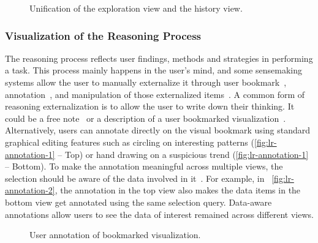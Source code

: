 \begin{figure}[!htb]
\centering
{} 
\hfill
{}
\caption{Unification of the exploration view and the history view. }
\end{figure}

\subsubsection{Visualization of the Reasoning Process}
The reasoning process reflects user findings, methods and strategies in performing a task. This process mainly happens in the user's mind, and some sensemaking systems allow the user to manually externalize it through user bookmark~\cite{Walker2013}, annotation~\cite{Heer2009}, and manipulation of those externalized items~\cite{Xu2014}. A common form of reasoning externalization is to allow the user to write down their thinking. It could be a free note~\cite{Shrinivasan2008} or a description of a user bookmarked visualization~\cite{Walker2013}. Alternatively, users can annotate directly on the visual bookmark using standard graphical editing features such as circling on interesting patterns (\autoref{fig:lr-annotation-1} -- Top) or hand drawing on a suspicious trend (\autoref{fig:lr-annotation-1} -- Bottom). To make the annotation meaningful across multiple views, the selection should be aware of the data involved in it~\cite{Heer2008a}. For example, in~ \autoref{fig:lr-annotation-2}, the annotation in the top view also makes the data items in the bottom view get annotated using the same selection query. Data-aware annotations allow users to see the data of interest remained across different views.

\begin{figure}[!htb]
\centering
{} 
\hfill
{}
\caption{User annotation of bookmarked visualization.}
\label{fig:lr-annotation}
\end{figure}

